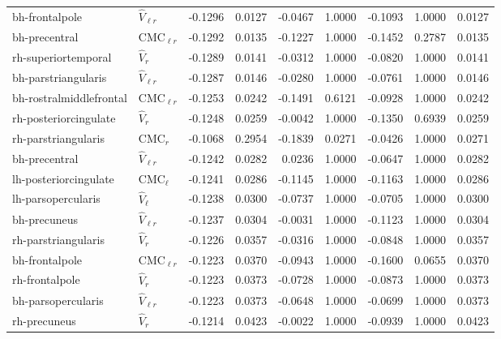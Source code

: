 \documentclass{article}
\begin{document}
\begin{table}
\begin{tabular}{llrrrrrrr}
	bh-frontalpole & $\hat{V}_{\ell r}$ & -0.1296 & 0.0127 & -0.0467 & 1.0000 & -0.1093 & 1.0000 & 0.0127 \\
	bh-precentral & $\text{CMC}_{\ell r}$ & -0.1292 & 0.0135 & -0.1227 & 1.0000 & -0.1452 & 0.2787 & 0.0135 \\
	rh-superiortemporal & $\hat{V}_{r}$ & -0.1289 & 0.0141 & -0.0312 & 1.0000 & -0.0820 & 1.0000 & 0.0141 \\
	bh-parstriangularis & $\hat{V}_{\ell r}$ & -0.1287 & 0.0146 & -0.0280 & 1.0000 & -0.0761 & 1.0000 & 0.0146 \\
	bh-rostralmiddlefrontal & $\text{CMC}_{\ell r}$ & -0.1253 & 0.0242 & -0.1491 & 0.6121 & -0.0928 & 1.0000 & 0.0242 \\
	rh-posteriorcingulate & $\hat{V}_{r}$ & -0.1248 & 0.0259 & -0.0042 & 1.0000 & -0.1350 & 0.6939 & 0.0259 \\
	rh-parstriangularis & $\text{CMC}_r$ & -0.1068 & 0.2954 & -0.1839 & 0.0271 & -0.0426 & 1.0000 & 0.0271 \\
	bh-precentral & $\hat{V}_{\ell r}$ & -0.1242 & 0.0282 & 0.0236 & 1.0000 & -0.0647 & 1.0000 & 0.0282 \\
	lh-posteriorcingulate & $\text{CMC}_{\ell}$ & -0.1241 & 0.0286 & -0.1145 & 1.0000 & -0.1163 & 1.0000 & 0.0286 \\
	lh-parsopercularis & $\hat{V}_{\ell}$ & -0.1238 & 0.0300 & -0.0737 & 1.0000 & -0.0705 & 1.0000 & 0.0300 \\
	bh-precuneus & $\hat{V}_{\ell r}$ & -0.1237 & 0.0304 & -0.0031 & 1.0000 & -0.1123 & 1.0000 & 0.0304 \\
	rh-parstriangularis & $\hat{V}_{r}$ & -0.1226 & 0.0357 & -0.0316 & 1.0000 & -0.0848 & 1.0000 & 0.0357 \\
	bh-frontalpole & $\text{CMC}_{\ell r}$ & -0.1223 & 0.0370 & -0.0943 & 1.0000 & -0.1600 & 0.0655 & 0.0370 \\
	rh-frontalpole & $\hat{V}_{r}$ & -0.1223 & 0.0373 & -0.0728 & 1.0000 & -0.0873 & 1.0000 & 0.0373 \\
	bh-parsopercularis & $\hat{V}_{\ell r}$ & -0.1223 & 0.0373 & -0.0648 & 1.0000 & -0.0699 & 1.0000 & 0.0373 \\
	rh-precuneus & $\hat{V}_{r}$ & -0.1214 & 0.0423 & -0.0022 & 1.0000 & -0.0939 & 1.0000 & 0.0423 \\

\end{tabular}
\end{table}
\end{document}
